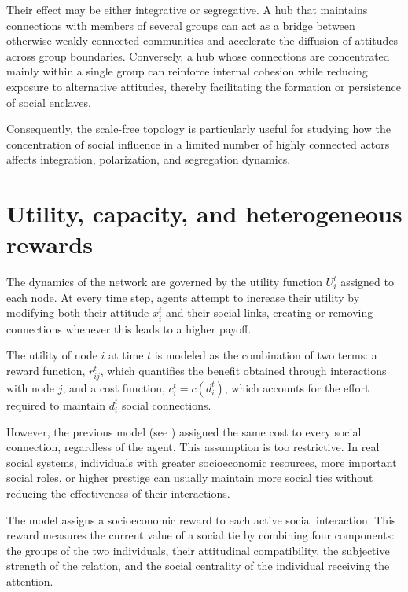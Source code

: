 \documentclass[11pt,a4paper]{article}
\begin{document}
	Their effect may be either integrative or segregative. A hub that maintains connections with members of several groups can act as a bridge between otherwise weakly connected communities and accelerate the diffusion of attitudes across group boundaries. Conversely, a hub whose connections are concentrated mainly within a single group can reinforce internal cohesion while reducing exposure to alternative
	attitudes, thereby facilitating the formation or persistence of social enclaves.
	
	Consequently, the scale-free topology is particularly useful for
	studying how the concentration of social influence in a limited number of highly connected actors affects integration, polarization, and segregation dynamics.

	\section{Utility, capacity, and heterogeneous rewards}\label{sec4_utility}
	The dynamics of the network are governed by the utility function $U_i^t$ assigned to each node. At every time step, agents attempt to increase their utility by modifying both their attitude $x_i^t$ and their social links, creating or removing connections whenever this leads to a higher payoff.
	
	The utility of node $i$ at time $t$ is modeled as the combination of two terms: a reward function, $r_{ij}^t$, which quantifies the benefit obtained through interactions with node $j$, and a cost function, $c_i^t = c(d_i^t)$, which accounts for the effort required to maintain $d_i^t$ social connections.
	
	However, the previous model (see \cite{chuang2019}) assigned the same cost to every social connection, regardless of the agent. This assumption is too restrictive. In real social systems, individuals with greater socioeconomic resources, more important social roles, or higher prestige can usually maintain more social ties without reducing the effectiveness of their interactions.

	The model assigns a socioeconomic reward to each active social
	interaction. This reward measures the current value of a social tie by combining four components: the groups of the two individuals, their attitudinal compatibility, the subjective strength of the relation, and the social centrality of the individual receiving the attention.
	
\end{document}

